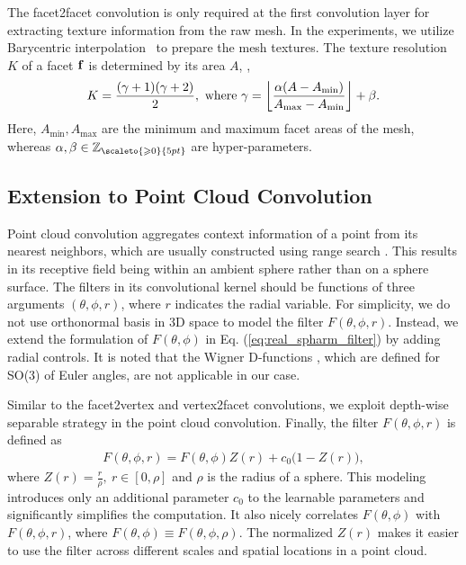 {The facet2facet convolution is only required at the first convolution layer for extracting texture information from the raw mesh.
In the experiments, we utilize Barycentric interpolation~\cite{coxeter1961introduction} to prepare the mesh textures. 
The texture resolution $K$ of a facet ${\bf f}$ is determined by its area $A$, \ie,~ 
\begin{equation}\label{equ:interpolate_num}
K=\frac{(\gamma+1)(\gamma+2)}{2},~\text{where}~ 
\gamma=\left\lfloor \frac{\alpha(A-A_{\min})}{A_{\max}-A_{\min}}  \right\rfloor  + \beta.\\  
\end{equation}
Here, $A_{\min}, A_{\max}$ are the minimum and maximum facet areas of the mesh, whereas  $\alpha,\beta\in\mathbb{Z}_{\scaleto{\geqslant0\mathstrut}{5pt}}$ are  hyper-parameters. 

\subsection{Extension to Point Cloud Convolution}\label{subsec:pcloud_conv}
Point cloud convolution aggregates context information of a point from its nearest neighbors, which are usually constructed using range search \cite{preparata2012computational}. This results in its receptive field being within an ambient sphere rather than on a sphere surface. The filters in its convolutional kernel should be functions of three arguments $(\theta,\phi,r)$, where $r$ indicates the radial variable. For simplicity, we do not use orthonormal basis in 3D space to model the filter $F(\theta,\phi,r)$. Instead, we extend the formulation of $F(\theta,\phi)$ in Eq. (\ref{eq:real_spharm_filter}) by adding radial controls. It is noted  that the Wigner D-functions \cite{cohenspherical}, which are defined for SO(3) of Euler angles, are not applicable in our case.

Similar to the facet2vertex and vertex2facet convolutions, we exploit depth-wise separable strategy in the point cloud convolution. Finally, the filter $F(\theta,\phi,r)$ is defined as 
\begin{align}
F(\theta,\phi,r) = F(\theta,\phi)Z(r) + c_{0}\big(1-Z(r)\big),
\end{align}
where $Z(r)=\frac{r}{\rho},~r\in[0,\rho]$ and $\rho$ is the radius of a sphere. This modeling introduces only an additional parameter $c_0$ to the learnable parameters and significantly simplifies the computation. It also nicely correlates $F(\theta,\phi)$ with $F(\theta,\phi,r)$, where $F(\theta,\phi)\equiv F(\theta,\phi,\rho)$. The normalized $Z(r)$ makes it easier to use the filter across different scales and spatial locations in a point cloud.}

